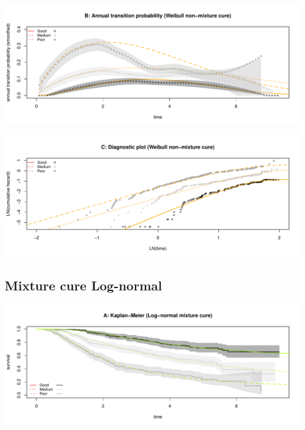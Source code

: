 \documentclass[
]{article}
\begin{document}
\begin{flushleft}\includegraphics[height=0.25\textheight]{Images/cure_weib_nmix-2} \end{flushleft}

\begin{flushleft}\includegraphics[height=0.25\textheight]{Images/cure_weib_nmix-3} \end{flushleft}

\clearpage

\hypertarget{mixture-cure-log-normal}{%
\subsection{Mixture cure Log-normal}\label{mixture-cure-log-normal}}

\begin{flushleft}\includegraphics[height=0.25\textheight]{Images/cure_lnorm_mix-1} \end{flushleft}
\end{document}
